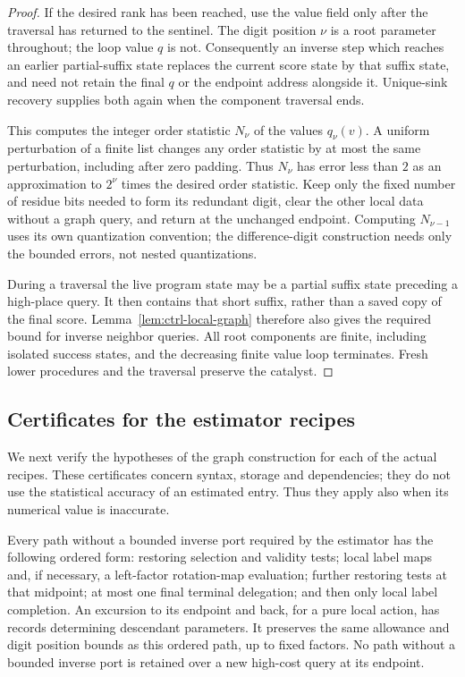 \begin{proof}
If the desired rank has been reached, use the value field only after
the traversal has returned to the sentinel.  The digit position $\nu$ is a root
parameter throughout; the loop value $q$ is not.  Consequently an inverse
step which reaches an earlier partial-suffix state replaces the current
score state by that suffix state, and need not retain the final $q$ or
the endpoint address alongside it.  Unique-sink recovery supplies both
again when the component traversal ends.

This computes the integer order statistic $N_\nu$ of the values $q_\nu(v)$.
A uniform
perturbation of a finite list changes any order statistic by at most
the same perturbation, including after zero padding.  Thus $N_\nu$ has
error less than $2$ as an approximation to $2^\nu$ times the desired order statistic.
Keep only the fixed number of residue bits needed to form its
redundant digit, clear the other local data without a graph query, and
return at the unchanged endpoint.  Computing $N_{\nu-1}$ uses its own
quantization convention; the difference-digit construction needs only
the bounded errors, not nested quantizations.

During a traversal the live program state may be a partial suffix state
preceding a high-place query.  It then contains that short suffix,
rather than a saved copy of the final score.  Lemma~\ref{lem:ctrl-local-graph}
therefore also gives the required bound for inverse neighbor queries.
All root components are finite, including isolated success states, and
the decreasing finite value loop terminates.  Fresh lower procedures
and the traversal preserve the catalyst.
\end{proof}

\subsection{Certificates for the estimator recipes}\label{sec:ctrl-recipes}

We next verify the hypotheses of the graph construction for each of the
actual recipes.  These certificates concern syntax, storage and
dependencies; they do not use the statistical accuracy of an estimated
entry.  Thus they apply also when its numerical value is inaccurate.

\begin{lemma}\label{lem:ctrl-paths}
Every path without a bounded inverse port required by the estimator has the following
ordered form: restoring selection and validity tests; local label maps
and, if necessary, a left-factor rotation-map evaluation; further restoring tests
at that midpoint; at most one final terminal delegation; and then only
local label completion.  An excursion to its endpoint and back, for a
pure local action, has records determining descendant parameters.  It preserves the same
allowance and digit position bounds as this ordered path, up to fixed factors.
No path without a bounded inverse port is retained over a new high-cost query at its
endpoint.
\end{lemma}

